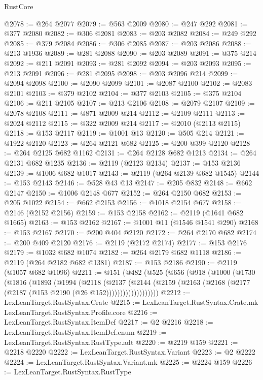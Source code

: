 \begin{lexlean}{RustCore}
\begin{coremodule}
@2078 := @264 @2077
@2079 := @563 @2009
@2080 := @247 @292
@2081 := @377 @2080
@2082 := @306 @2081
@2083 := @203 @2082
@2084 := @249 @292
@2085 := @379 @2084
@2086 := @306 @2085
@2087 := @203 @2086
@2088 := @213 @1936
@2089 := @281 @2088
@2090 := @203 @2089
@2091 := @375 @214
@2092 := @211 @2091
@2093 := @281 @2092
@2094 := @203 @2093
@2095 := @213 @2091
@2096 := @281 @2095
@2098 := @203 @2096 @214
@2099 := @2094 @2098
@2100 := @2090 @2099
@2101 := @2087 @2100
@2102 := @2083 @2101
@2103 := @379 @2102
@2104 := @377 @2103
@2105 := @375 @2104
@2106 := @211 @2105
@2107 := @213 @2106
@2108 := @2079 @2107
@2109 := @2078 @2108
@2111 := @871 @2009 @214
@2112 := @2109 @2111
@2113 := @2024 @2112
@2115 := @322 @2009 @214
@2117 := @2010 (@2113 @2115)
@2118 := @153 @2117
@2119 := @1001 @13
@2120 := @505 @214
@2121 := @1922 @2120
@2123 := @264 @2121 @682
@2125 := @200 @399 @2120
@2128 := @264 @2125 @682 @1162
@2131 := @264 @2128 @682 @1213
@2134 := @264 @2131 @682 @1235
@2136 := @2119 (@2123 @2134)
@2137 := @153 @2136
@2139 := @1006 @682 @1017
@2143 := @2119 (@264 @2139 @682 @1545)
@2144 := @153 @2143
@2146 := @528 @43 @13
@2147 := @205 @832
@2148 := @662 @2147
@2150 := @1006 @2148 @677
@2152 := @264 @2150 @682
@2153 := @205 @1022
@2154 := @662 @2153
@2156 := @1018 @2154 @677
@2158 := @2146 (@2152 @2156)
@2159 := @153 @2158
@2162 := @2119 (@1641 @682 @1665)
@2163 := @153 @2162
@2167 := @1001 @11 (@1546 @1541 @290)
@2168 := @153 @2167
@2170 := @200 @404 @2120
@2172 := @264 @2170 @682
@2174 := @200 @409 @2120
@2176 := @2119 (@2172 @2174)
@2177 := @153 @2176
@2179 := @1032 @682 @1074
@2182 := @264 @2179 @682 @1118
@2186 := @2119 (@264 @2182 @682 @1381)
@2187 := @153 @2186
@2190 := @2119 (@1057 @682 @1096)
@2211 := @151
    (@482
      (@525
        (@656
          (@918
            (@1000
              (@1730
                (@1816
                  (@1893
                    (@1994
                      (@2118
                        (@2137
                          (@2144
                            (@2159
                              (@2163 (@2168 (@2177 (@2187 (@153 @2190 (@26 @152)))))))))))))))))))
@2212 := LexLeanTarget.RustSyntax.Crate
@2215 := LexLeanTarget.RustSyntax.Crate.mk LexLeanTarget.RustSyntax.Profile.core
@2216 := LexLeanTarget.RustSyntax.ItemDef
@2217 := @2 @2216
@2218 := LexLeanTarget.RustSyntax.ItemDef.enum
@2219 := LexLeanTarget.RustSyntax.RustType.adt
@2220 := @2219 @159
@2221 := @2218 @2220
@2222 := LexLeanTarget.RustSyntax.Variant
@2223 := @2 @2222
@2224 := LexLeanTarget.RustSyntax.Variant.mk
@2225 := @2224 @159
@2226 := LexLeanTarget.RustSyntax.RustType

\end{coremodule}
\end{lexlean}
